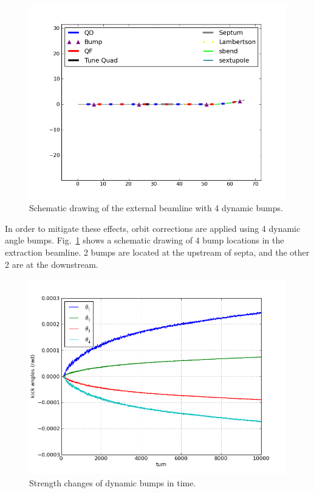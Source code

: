 \documentclass[aps,prstab,onecolumn,preprint,nofootinbib]{revtex4-1}
\begin{document}
\begin{figure}[tbh!]
  \begin{center}
    \includegraphics[width=.45\textwidth]{img/20140109-00.png}
    \caption{\label{fig:bump1}Schematic drawing of the external beamline with 4 dynamic bumps.}
  \end{center}
\end{figure}

In order to mitigate these effects, orbit corrections are applied using 4 dynamic angle bumps. Fig.~\ref{fig:bump1} shows a schematic drawing of 4 bump locations in the extraction beamline. 2 bumps are located at the upstream of septa, and the other 2 are at the downstream. 



\begin{figure}[tbh!]
  \begin{center}
    \includegraphics[width=.45\textwidth]{img/20140123-00.png}
    \caption{\label{fig:bump2}Strength changes of dynamic bumps in time.}
  \end{center}
\end{figure}
\end{document}
